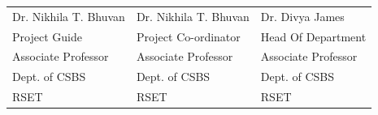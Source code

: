 \begin{flushleft}


	\begin{longtable}{p{5.8cm} p{5.8cm} p{5.8cm}}
		{Dr. Nikhila T. Bhuvan} & {Dr. Nikhila T. Bhuvan} & {Dr. Divya James}     \\
		{Project Guide}         & {Project Co-ordinator}  & {Head Of Department}  \\
		{Associate Professor}   & {Associate Professor}   & {Associate Professor} \\
		{Dept. of CSBS}         & {Dept. of CSBS}         & {Dept. of CSBS}       \\
		{RSET}                  & {RSET}                  & {RSET}                \\
	\end{longtable}
\end{flushleft}
\vspace{2cm}
